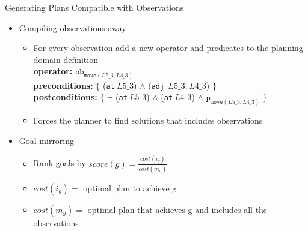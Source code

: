 \begin{frame}{Generating Plans Compatible with Observations}
\begin{itemize}
\item Compiling observations away
\begin{itemize}
\item For every observation add a new operator and predicates to the planning domain definition\\

\textbf{operator:} $\texttt{ob}_{\texttt{move}(L5\_3, L4\_3)}$\\
\textbf{preconditions:} $\lbrace$ (\texttt{at}$\:L5\_3$) $\land$  (\texttt{adj}$\:\:L5\_3$,$\:L4\_3$) $\rbrace$ \\
\textbf{postconditions:} $\lbrace$ $\neg$ (\texttt{at}$\:L5\_3$) $\land $ (\texttt{at}$\:L4\_3$) $\land$ $\texttt{p}_{\texttt{move}(L5\_3, L4\_3)}$ $\rbrace$\\

\item Forces the planner to find solutions that includes observations
\end{itemize}

\item Goal mirroring
\begin{itemize}
\item Rank goals by $score(g) = \frac{cost(i_g)}{cost(m_g)}$
\item $cost(i_g)=$ optimal plan to achieve g
\item $cost(m_g)=$ optimal plan that achieves g and includes all the observations
\end{itemize}
\end{itemize}
\end{frame}